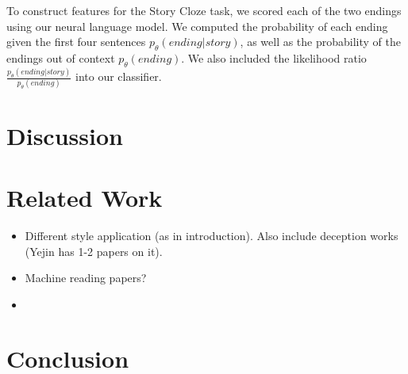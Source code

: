 \documentclass[11pt,a4paper]{article}
\newcommand{\isection}[2]{\section{#1}\label{ssec:#2}}
\newcommand{\isectionb}[1]{\section{#1}\label{ssec:#1}}
\newcommand{\ms}[1]{{\color{cyan}\{\textit{#1}\}$_{ms}$}}
\newcommand{\roy}[1]{\footnote{\color{red}{\textbf{Roy: #1}}}}
\renewcommand{\ms}[1]{}
\renewcommand{\roy}[1]{}
\begin{document}
To construct features for the Story Cloze task, we scored each of the two endings using our neural language model. We computed the probability of each ending given the first four sentences $p_\theta(ending|story)$, as well as the probability of the endings out of context $p_\theta(ending)$. We also included the likelihood ratio $\frac{p_\theta(ending|story)}{p_\theta(ending)}$ into our classifier.\roy{This will probably change once we have the rest of the paper, but generally a few things that are missing:
(a) performance of the model as a standalone (both how we evaluated it and how much it got).
(b) modifying this paragraph to indicate that in order to combine between the style features presented in this paper and this model, we did the above.
(c) results of the combination (75.1\%).\\
These numbers might best fit in a small table.}

\isectionb{Discussion}



\isection{Related Work}{Related}

\begin{itemize}
\item Different style application (as in introduction). Also include deception works (Yejin has 1-2 papers on it). 
\item Machine reading papers? 
\item \ms{Pennebaker's work on function words?}
\end{itemize}


\isectionb{Conclusion}




%
%

\newpage


\end{document}
